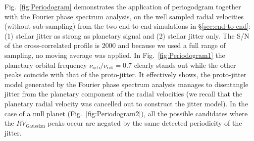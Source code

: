 Fig.~\ref{fig:Periodogram} demonstrates the application of periogodgram together with the Fourier phase spectrum analysis, on the well sampled radial velocities (without sub-sampling) from the two end-to-end simulations in \S\ref{sec:end-to-end}: (1) stellar jitter as strong as planetary signal and (2) stellar jitter only. The S/N of the cross-correlated profile is 2000 and because we used a full range of sampling, no moving average was applied. In Fig.~\ref{fig:Periodogram1} the planetary orbital frequency $\nu_\text{orb}/\nu_\text{rot} = 0.7$ clearly stands out while the other peaks coincide with that of the proto-jitter. It effectively shows, the proto-jitter model generated by the Fourier phase spectrum analysis manages to disentangle jitter from the planetary component of the radial velocities (we recall that the planetary radial velocity was cancelled out to construct the jitter model). In the case of a null planet (Fig.~\ref{fig:Periodogram2}), all the possible candidates where the $RV_\text{Gaussian}$ peaks occur are negated by the same detected periodicity of the jitter. 

